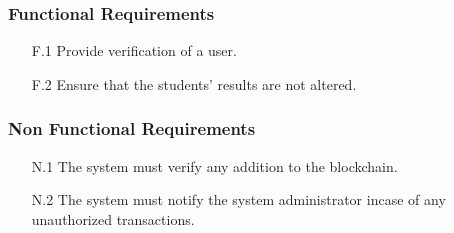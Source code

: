 \subsubsection{Functional Requirements}
\begin{enumerate}
\item[F.1] Provide verification of a user.
\item[F.2] Ensure that the students’ results are not altered.
\end{enumerate}

\subsubsection{Non Functional Requirements}
\begin{itemize}
\item[N.1] The system must verify any addition to the blockchain.
\item[N.2] The system must notify the system administrator incase of any unauthorized transactions.
\end{itemize}

